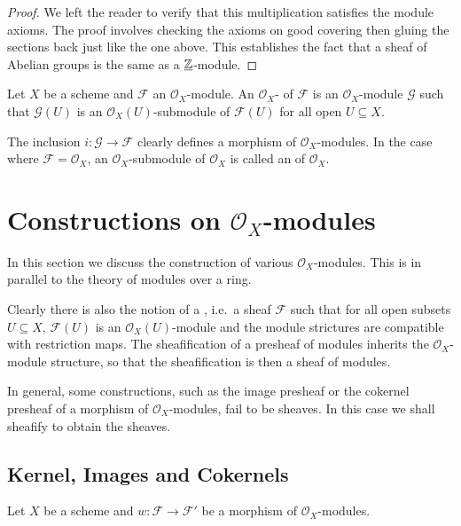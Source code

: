 \begin{proof}
	We left the reader to verify that this multiplication satisfies the module axioms. The proof involves checking the axioms on good covering then gluing the sections back just like the one above. This establishes the fact that a sheaf of Abelian groups is the same as a $\underline{\mathbb Z}$-module.
\end{proof}

\begin{definition}
	Let $X$ be a scheme and $\mathcal{F}$ an $\mathcal{O}_X$-module. An $\mathcal{O}_X$- of $\mathcal{F}$ is an $\mathcal{O}_X$-module $\mathcal{G}$ such that $\mathcal{G}(U)$ is an $\mathcal{O}_X(U)$-submodule of $\mathcal{F}(U)$ for all open $U \subseteq X$.
\end{definition}

The inclusion $i \colon \mathcal{G} \to \mathcal{F}$ clearly defines a morphism of $\mathcal{O}_X$-modules. In the case where $\mathcal{F} = \mathcal{O}_X$, an $\mathcal{O}_X$-submodule of $\mathcal{O}_X$ is called an  of $\mathcal{O}_X$.

\section{Constructions on $\mathcal{O}_{X}$-modules}

In this section we discuss the construction of various $\mathcal{O}_X$-modules. This is in parallel to the theory of modules over a ring.

\begin{remark}
	Clearly there is also the notion of a , i.e.~a sheaf $\mathcal{F}$ such that for all open subsets $U\subseteq X$, $\mathcal{F}(U)$ is an $\mathcal{O}_X(U)$-module and the module strictures are compatible with restriction maps. The sheafification of a presheaf of modules inherits the $\mathcal{O}_X$-module structure, so that the sheafification is then a sheaf of modules.
\end{remark}

In general, some constructions, such as the image presheaf or the cokernel presheaf of a morphism of $\mathcal{O}_X$-modules, fail to be sheaves. In this case we shall sheafify to obtain the sheaves.

\subsection*{Kernel, Images and Cokernels}

Let $X$ be a scheme and $w \colon \mathcal{F} \to \mathcal{F}'$ be a morphism of $\mathcal{O}_X$-modules.

